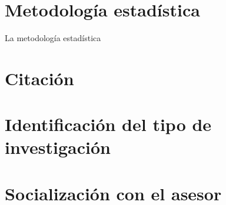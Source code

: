 
\newpage
\section{Metodología estadística}

La metodología estadística 

\section{Citación}

\cite{grana2015image}

\section{Identificación del tipo de investigación}

\section{Socialización con el asesor}


